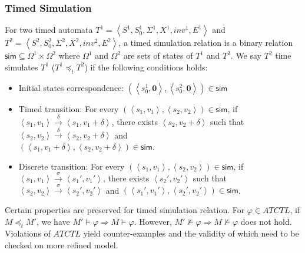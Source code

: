 \subsubsection{Timed Simulation}
For two timed automata $T^1=\left\langle S^1,S_0^1,\Sigma^1,X^1,inv^1,E^1\right\rangle$ and $T^2=\left\langle S^2,S_0^2,\Sigma^2,X^2,inv^2,E^2\right\rangle$, a timed simulation relation is a binary relation $\textsf{sim}\subseteq \Omega^1\times \Omega^2$ where $\Omega^1$ and $\Omega^2$ are sets of states of $T^1$ and $T^2$. We say $T^2$ \textsf{time simulates} $T^1$ ($T^1 \preceq_t T^2$) if the following conditions holds:
\begin{itemize}
	\item Initial states correspondence: $(\left\langle s_0^1,\textbf{0}\right\rangle,\left\langle s_0^2,\textbf{0}\right\rangle)\in \textsf{sim}$
	\item Timed transition: For every $(\left\langle s_1,v_1\right\rangle,\left\langle s_2,v_2\right\rangle)\in\textsf{sim}$, if $\left\langle s_1,v_1\right\rangle\xrightarrow{\delta}\left\langle s_1,v_1+\delta\right\rangle$, there exists $\left\langle s_2,v_2+\delta\right\rangle$ such that $\left\langle s_2,v_2\right\rangle\xrightarrow{\delta}\left\langle s_2,v_2+\delta\right\rangle$ and \\$(\left\langle s_1,v_1+\delta\right\rangle,\left\langle s_2,v_2+\delta\right\rangle)\in\textsf{sim}$.
	\item Discrete transition: For every $(\left\langle s_1,v_1\right\rangle,\left\langle s_2,v_2\right\rangle)\in\textsf{sim}$, if $\left\langle s_1,v_1\right\rangle\xrightarrow{\sigma}\left\langle s_1',v_1'\right\rangle$, there exists $\left\langle s_2',v_2'\right\rangle$ such that $\left\langle s_2,v_2\right\rangle\xrightarrow{\sigma}\left\langle s_2',v_2'\right\rangle$ and $(\left\langle s_1',v_1'\right\rangle,\left\langle s_2',v_2'\right\rangle)\in\textsf{sim}$.
\end{itemize}

Certain properties are preserved for timed simulation relation. For $\varphi\in ATCTL$, if $M\preceq_t M'$, we have $M'\models \varphi\Rightarrow M\models\varphi$.\cite{simulation} However, $M'\not\models \varphi\Rightarrow M\not\models\varphi$ does not hold. Violations of $ATCTL$ yield \textsf{counter-examples} and the validity of which need to be checked on more refined model.

